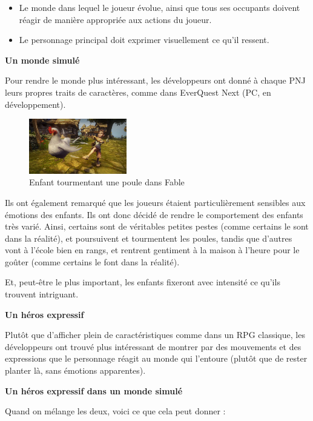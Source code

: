 \documentclass[a4paper, 12pt]{article} %
\begin{document}
\begin{itemize}
	\item Le monde dans lequel le joueur évolue, ainsi que tous ses occupants doivent réagir de manière appropriée aux actions du joueur.
	\item Le personnage principal doit exprimer visuellement ce qu’il ressent.
\end{itemize}
	
\textbf{Un monde simulé}

Pour rendre le monde plus intéressant, les développeurs ont donné à chaque PNJ leurs propres traits de caractères, comme dans EverQuest Next (PC, en développement).

\begin{figure}
	\begin{center}
		\includegraphics[width=0.38\textwidth]{images/chicken.jpg}
	\end{center}
	\caption{Enfant tourmentant une poule dans Fable}
\end{figure}

Ils ont également remarqué que les joueurs étaient particulièrement sensibles aux émotions des enfants. Ils ont donc décidé de rendre le comportement des enfants très varié. Ainsi, certains sont de véritables petites pestes (comme certains le sont dans la réalité), et poursuivent et tourmentent les poules, tandis que d’autres vont à l’école bien en rangs, et rentrent gentiment à la maison à l’heure pour le goûter (comme certains le font dans la réalité).

Et, peut-être le plus important, les enfants fixeront avec intensité ce qu’ils trouvent intriguant.

\textbf{Un héros expressif}

Plutôt que d’afficher plein de caractéristiques comme dans un RPG classique, les développeurs ont trouvé plus intéressant de montrer par des mouvements et des expressions que le personnage réagit au monde qui l’entoure (plutôt que de rester planter là, sans émotions apparentes).

\textbf{Un héros expressif dans un monde simulé}

Quand on mélange les deux, voici ce que cela peut donner :
\end{document}
